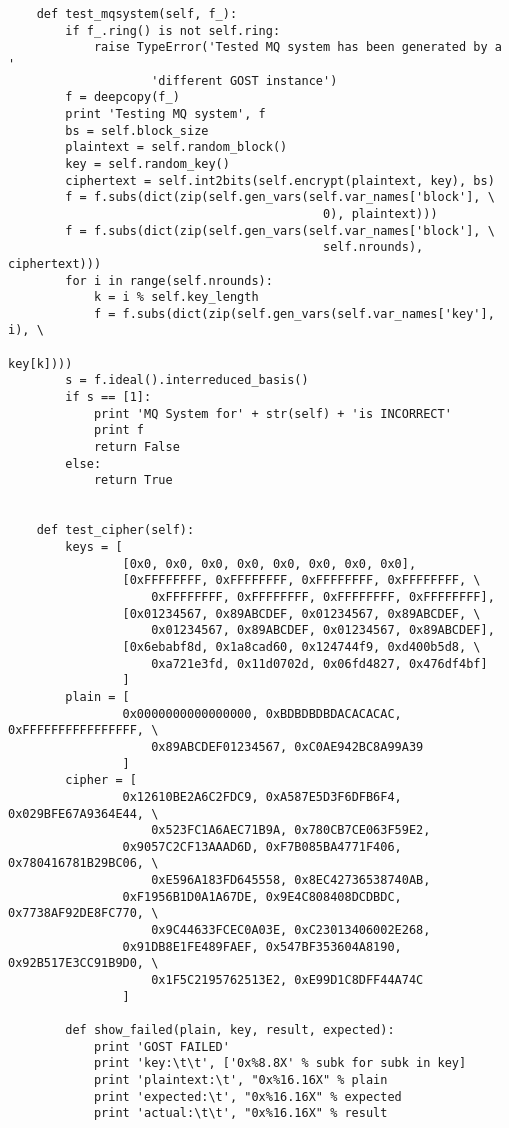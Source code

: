 \begin{lstlisting}
    def test_mqsystem(self, f_):
        if f_.ring() is not self.ring:
            raise TypeError('Tested MQ system has been generated by a ' 
                    'different GOST instance')
        f = deepcopy(f_)
        print 'Testing MQ system', f
        bs = self.block_size
        plaintext = self.random_block()
        key = self.random_key()
        ciphertext = self.int2bits(self.encrypt(plaintext, key), bs)
        f = f.subs(dict(zip(self.gen_vars(self.var_names['block'], \
                                            0), plaintext)))
        f = f.subs(dict(zip(self.gen_vars(self.var_names['block'], \
                                            self.nrounds), ciphertext)))
        for i in range(self.nrounds):
            k = i % self.key_length
            f = f.subs(dict(zip(self.gen_vars(self.var_names['key'], i), \
                                                                key[k])))
        s = f.ideal().interreduced_basis()
        if s == [1]:
            print 'MQ System for' + str(self) + 'is INCORRECT'
            print f
            return False
        else:
            return True


    def test_cipher(self):
        keys = [
                [0x0, 0x0, 0x0, 0x0, 0x0, 0x0, 0x0, 0x0], 
                [0xFFFFFFFF, 0xFFFFFFFF, 0xFFFFFFFF, 0xFFFFFFFF, \
                    0xFFFFFFFF, 0xFFFFFFFF, 0xFFFFFFFF, 0xFFFFFFFF], 
                [0x01234567, 0x89ABCDEF, 0x01234567, 0x89ABCDEF, \
                    0x01234567, 0x89ABCDEF, 0x01234567, 0x89ABCDEF], 
                [0x6ebabf8d, 0x1a8cad60, 0x124744f9, 0xd400b5d8, \
                    0xa721e3fd, 0x11d0702d, 0x06fd4827, 0x476df4bf]
                ]
        plain = [
                0x0000000000000000, 0xBDBDBDBDACACACAC, 0xFFFFFFFFFFFFFFFF, \
                    0x89ABCDEF01234567, 0xC0AE942BC8A99A39
                ]
        cipher = [
                0x12610BE2A6C2FDC9, 0xA587E5D3F6DFB6F4, 0x029BFE67A9364E44, \
                    0x523FC1A6AEC71B9A, 0x780CB7CE063F59E2,
                0x9057C2CF13AAAD6D, 0xF7B085BA4771F406, 0x780416781B29BC06, \
                    0xE596A183FD645558, 0x8EC42736538740AB,
                0xF1956B1D0A1A67DE, 0x9E4C808408DCDBDC, 0x7738AF92DE8FC770, \
                    0x9C44633FCEC0A03E, 0xC23013406002E268,
                0x91DB8E1FE489FAEF, 0x547BF353604A8190, 0x92B517E3CC91B9D0, \
                    0x1F5C2195762513E2, 0xE99D1C8DFF44A74C
                ]

        def show_failed(plain, key, result, expected):
            print 'GOST FAILED'
            print 'key:\t\t', ['0x%8.8X' % subk for subk in key]
            print 'plaintext:\t', "0x%16.16X" % plain
            print 'expected:\t', "0x%16.16X" % expected
            print 'actual:\t\t', "0x%16.16X" % result


\end{lstlisting}
